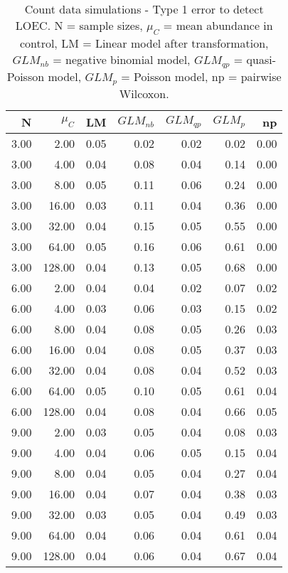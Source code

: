 \begin{table}
\centering
\caption[Count data simulations - Type 1 error to detect LOEC.]{Count data simulations - Type 1 error to detect LOEC. N = sample sizes, 
             $\mu_C$ = mean abundance in control, LM = Linear model after transformation, 
             $GLM_{nb}$ = negative binomial model, $GLM_{qp}$ = quasi-Poisson model, 
            $GLM_{p}$ = Poisson model, np = pairwise Wilcoxon.} 
\label{tab:t1_loec_c}
{\footnotesize
\begin{tabular}{rrrrrrr}
  \hline
N & $\mu_C$ & LM & $GLM_{nb}$ & $GLM_{qp}$ & $GLM_{p}$ & np \\ 
  \hline
3.00 & 2.00 & 0.05 & 0.02 & 0.02 & 0.02 & 0.00 \\ 
  3.00 & 4.00 & 0.04 & 0.08 & 0.04 & 0.14 & 0.00 \\ 
  3.00 & 8.00 & 0.05 & 0.11 & 0.06 & 0.24 & 0.00 \\ 
  3.00 & 16.00 & 0.03 & 0.11 & 0.04 & 0.36 & 0.00 \\ 
  3.00 & 32.00 & 0.04 & 0.15 & 0.05 & 0.55 & 0.00 \\ 
  3.00 & 64.00 & 0.05 & 0.16 & 0.06 & 0.61 & 0.00 \\ 
  3.00 & 128.00 & 0.04 & 0.13 & 0.05 & 0.68 & 0.00 \\ 
  6.00 & 2.00 & 0.04 & 0.04 & 0.02 & 0.07 & 0.02 \\ 
  6.00 & 4.00 & 0.03 & 0.06 & 0.03 & 0.15 & 0.02 \\ 
  6.00 & 8.00 & 0.04 & 0.08 & 0.05 & 0.26 & 0.03 \\ 
  6.00 & 16.00 & 0.04 & 0.08 & 0.05 & 0.37 & 0.03 \\ 
  6.00 & 32.00 & 0.04 & 0.08 & 0.04 & 0.52 & 0.03 \\ 
  6.00 & 64.00 & 0.05 & 0.10 & 0.05 & 0.61 & 0.04 \\ 
  6.00 & 128.00 & 0.04 & 0.08 & 0.04 & 0.66 & 0.05 \\ 
  9.00 & 2.00 & 0.03 & 0.05 & 0.04 & 0.08 & 0.03 \\ 
  9.00 & 4.00 & 0.04 & 0.06 & 0.05 & 0.15 & 0.04 \\ 
  9.00 & 8.00 & 0.04 & 0.05 & 0.04 & 0.27 & 0.04 \\ 
  9.00 & 16.00 & 0.04 & 0.07 & 0.04 & 0.38 & 0.03 \\ 
  9.00 & 32.00 & 0.03 & 0.05 & 0.04 & 0.49 & 0.03 \\ 
  9.00 & 64.00 & 0.04 & 0.06 & 0.04 & 0.61 & 0.04 \\ 
  9.00 & 128.00 & 0.04 & 0.06 & 0.04 & 0.67 & 0.04 \\ 
   \hline
\end{tabular}
}
\end{table}
